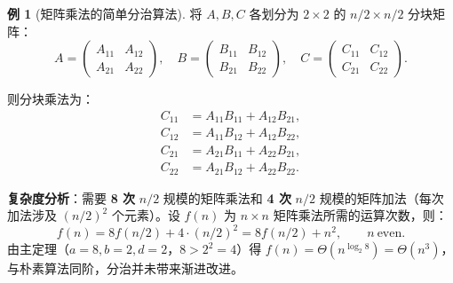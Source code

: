 \documentclass[UTF8,11pt,a4paper]{ctexbook}   %
\theoremstyle{definition}
\newtheorem{example}{例}[section]
\begin{document}
\begin{example}[矩阵乘法的简单分治算法]
将 $A,B,C$ 各划分为 $2\times 2$ 的 $n/2\times n/2$ 分块矩阵：
\[
A = \begin{pmatrix} A_{11} & A_{12}\\ A_{21} & A_{22}\end{pmatrix},\quad
B = \begin{pmatrix} B_{11} & B_{12}\\ B_{21} & B_{22}\end{pmatrix},\quad
C = \begin{pmatrix} C_{11} & C_{12}\\ C_{21} & C_{22}\end{pmatrix}.
\]

则分块乘法为：
\begin{align*}
C_{11} &= A_{11}B_{11} + A_{12}B_{21},\\
C_{12} &= A_{11}B_{12} + A_{12}B_{22},\\
C_{21} &= A_{21}B_{11} + A_{22}B_{21},\\
C_{22} &= A_{21}B_{12} + A_{22}B_{22}.
\end{align*}

\textbf{复杂度分析}：需要 \textbf{8 次} $n/2$ 规模的矩阵乘法和 \textbf{4 次} $n/2$ 规模的矩阵加法（每次加法涉及 $(n/2)^2$ 个元素）。设 $f(n)$ 为 $n\times n$ 矩阵乘法所需的运算次数，则：
\[
f(n) = 8f(n/2) + 4\cdot(n/2)^2 = 8f(n/2) + n^2,\qquad n\ \text{even}.
\]
由主定理（$a=8,b=2,d=2$，$8>2^2=4$）得 $f(n) = \Theta(n^{\log_2 8}) = \Theta(n^3)$，与朴素算法同阶，分治并未带来渐进改进。
\end{example}
\end{document}
